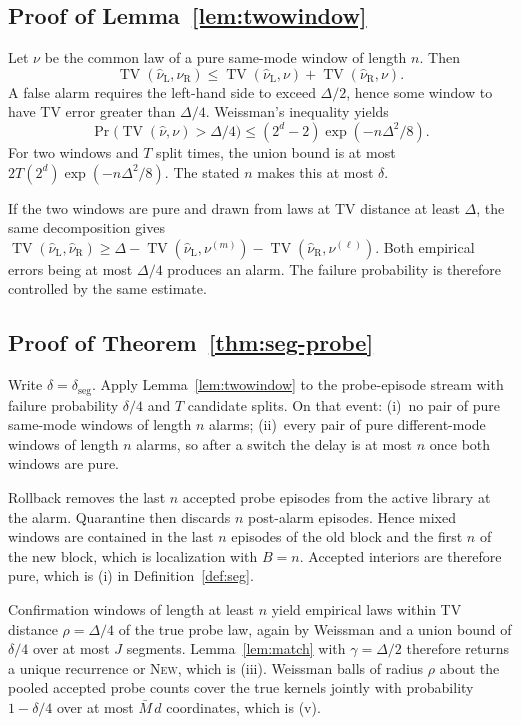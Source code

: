 \documentclass[11pt]{article}
\newcommand{\TV}{\operatorname{TV}}
\newcommand{\Prb}{\Pr}
\newcommand{\deltaseg}{\delta_{\mathrm{seg}}}
\begin{document}
\subsection{Proof of Lemma~\ref{lem:twowindow}}
Let $\nu$ be the common law of a pure same-mode window of length $n$. Then
\[
\TV(\widehat\nu_{\mathrm{L}},\widehat\nu_{\mathrm{R}})
\le \TV(\widehat\nu_{\mathrm{L}},\nu)+\TV(\widehat\nu_{\mathrm{R}},\nu).
\]
A false alarm requires the left-hand side to exceed $\Delta/2$, hence some
window to have TV error greater than $\Delta/4$. Weissman's inequality yields
\[
\Prb\bigl(\TV(\widehat\nu,\nu)>\Delta/4\bigr)
\le (2^d-2)\exp(-n\Delta^2/8).
\]
For two windows and $T$ split times, the union bound is at most
$2T(2^d)\exp(-n\Delta^2/8)$. The stated $n$ makes this at most $\delta$.

If the two windows are pure and drawn from laws at TV distance at least
$\Delta$, the same decomposition gives
$\TV(\widehat\nu_{\mathrm{L}},\widehat\nu_{\mathrm{R}})
\ge\Delta-\TV(\widehat\nu_{\mathrm{L}},\nu^{(m)})-\TV(\widehat\nu_{\mathrm{R}},\nu^{(\ell)})$.
Both empirical errors being at most $\Delta/4$ produces an alarm. The failure
probability is therefore controlled by the same estimate.

\subsection{Proof of Theorem~\ref{thm:seg-probe}}
Write $\delta=\deltaseg$. Apply Lemma~\ref{lem:twowindow} to the probe-episode
stream with failure probability $\delta/4$ and $T$ candidate splits. On that
event: (i)~no pair of pure same-mode windows of length $n$ alarms;
(ii)~every pair of pure different-mode windows of length $n$ alarms, so after
a switch the delay is at most $n$ once both windows are pure.

Rollback removes the last $n$ accepted probe episodes from the active library
at the alarm. Quarantine then discards $n$ post-alarm episodes. Hence mixed
windows are contained in the last $n$ episodes of the old block and the first
$n$ of the new block, which is localization with $B=n$. Accepted interiors
are therefore pure, which is (i) in Definition~\ref{def:seg}.

Confirmation windows of length at least $n$ yield empirical laws within TV
distance $\rho=\Delta/4$ of the true probe law, again by Weissman and a union
bound of $\delta/4$ over at most $J$ segments. Lemma~\ref{lem:match} with
$\gamma=\Delta/2$ therefore returns a unique recurrence or \textsc{New}, which
is (iii). Weissman balls of radius $\rho$ about the pooled accepted probe
counts cover the true kernels jointly with probability $1-\delta/4$ over at
most $\bar M\,d$ coordinates, which is (v).
\end{document}
